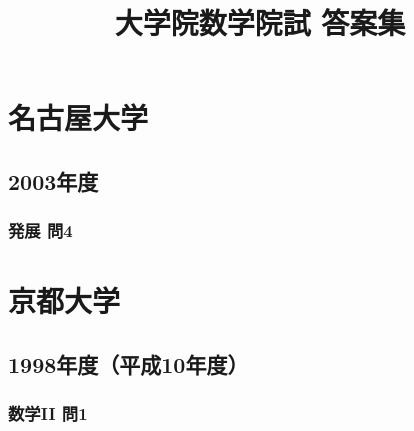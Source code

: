\documentclass[uplatex,a4paper,11pt,openany,nomag]{jsbook}
\title{大学院数学院試 答案集}
\author{}
\date{}
\begin{document}
\frontmatter
\maketitle
\tableofcontents

\mainmatter

\part{名古屋大学}

\chapter{2003年度}

\section{発展 問4}
\BeginAnswer


\part{京都大学}

\chapter{1998年度（平成10年度）}

\section{数学II 問1}
\BeginAnswer

\end{document}
